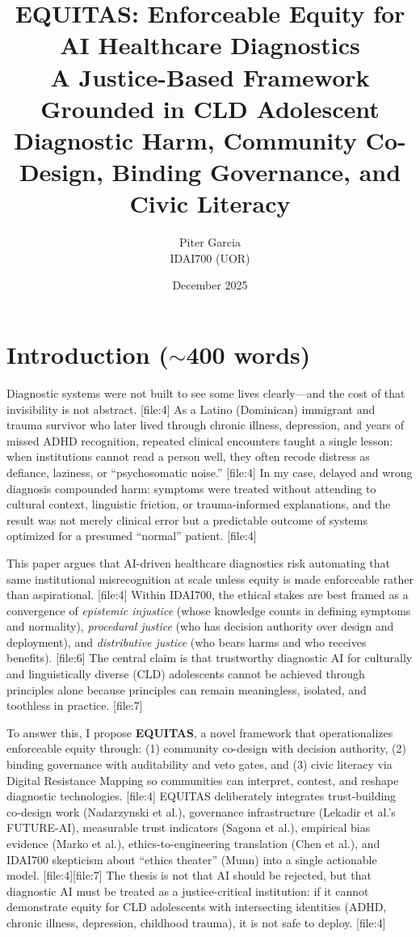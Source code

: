 \documentclass[12pt]{article}
\title{\vspace{-1.2cm}
EQUITAS: Enforceable Equity for AI Healthcare Diagnostics\\
\large A Justice-Based Framework Grounded in CLD Adolescent Diagnostic Harm, Community Co-Design, Binding Governance, and Civic Literacy
}
\author{Piter Garcia\\IDAI700 (UOR)}
\date{December 2025}
\begin{document}
\maketitle

\section{Introduction (\texorpdfstring{$\sim$}{\textasciitilde}400 words)}

Diagnostic systems were not built to see some lives clearly---and the cost of that invisibility is not abstract. [file:4]
As a Latino (Dominican) immigrant and trauma survivor who later lived through chronic illness, depression, and years of missed ADHD recognition, repeated clinical encounters taught a single lesson: when institutions cannot read a person well, they often recode distress as defiance, laziness, or ``psychosomatic noise.'' [file:4]
In my case, delayed and wrong diagnosis compounded harm: symptoms were treated without attending to cultural context, linguistic friction, or trauma-informed explanations, and the result was not merely clinical error but a predictable outcome of systems optimized for a presumed ``normal'' patient. [file:4]

This paper argues that AI-driven healthcare diagnostics risk automating that same institutional misrecognition at scale unless equity is made enforceable rather than aspirational. [file:4]
Within IDAI700, the ethical stakes are best framed as a convergence of \textit{epistemic injustice} (whose knowledge counts in defining symptoms and normality), \textit{procedural justice} (who has decision authority over design and deployment), and \textit{distributive justice} (who bears harms and who receives benefits). [file:6]
The central claim is that trustworthy diagnostic AI for culturally and linguistically diverse (CLD) adolescents cannot be achieved through principles alone because principles can remain meaningless, isolated, and toothless in practice. [file:7]

To answer this, I propose \textbf{EQUITAS}, a novel framework that operationalizes enforceable equity through: (1) community co-design with decision authority, (2) binding governance with auditability and veto gates, and (3) civic literacy via Digital Resistance Mapping so communities can interpret, contest, and reshape diagnostic technologies. [file:4]
EQUITAS deliberately integrates trust-building co-design work (Nadarzynski et al.), governance infrastructure (Lekadir et al.'s FUTURE-AI), measurable trust indicators (Sagona et al.), empirical bias evidence (Marko et al.), ethics-to-engineering translation (Chen et al.), and IDAI700 skepticism about ``ethics theater'' (Munn) into a single actionable model. [file:4][file:7]
The thesis is not that AI should be rejected, but that diagnostic AI must be treated as a justice-critical institution: if it cannot demonstrate equity for CLD adolescents with intersecting identities (ADHD, chronic illness, depression, childhood trauma), it is not safe to deploy. [file:4]
\end{document}
